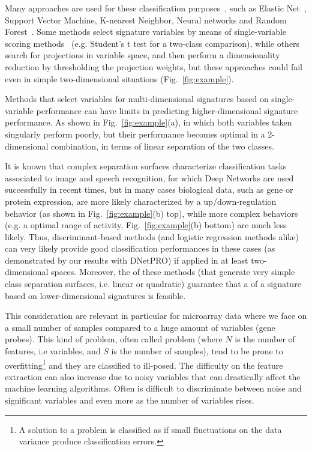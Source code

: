 \documentclass{standalone}
\begin{document}
Many approaches are used for these classification purposes~\cite{Guyon2002}, such as Elastic Net~\cite{Hughey2015}, Support Vector Machine, K-nearest Neighbor, Neural networks and Random Forest~\cite{Pang2012}.
Some methods select signature variables by means of single-variable scoring methods~\cite{Eckhard2012, Hocking1976} (e.g. Student's t test for a two-class comparison), while others search for projections in variable space, and then perform a dimensionality reduction by thresholding the projection weights, but these approaches could fail even in simple two-dimensional situations (Fig.~\ref{fig:example}).

Methods that select variables for multi-dimensional signatures based on single-variable performance can have limits in predicting higher-dimensional signature performance.
As shown in Fig.~\ref{fig:example}(a), in which both variables taken singularly perform poorly, but their performance becomes optimal in a 2-dimensional combination, in terms of linear separation of the two classes.

It is known that complex separation surfaces characterize classification tasks associated to image and speech recognition, for which Deep Networks are used successfully in recent times, but in many cases biological data, such as gene or protein expression, are more likely characterized by a up/down-regulation behavior (as shown in Fig.~\ref{fig:example}(b) top), while more complex behaviors (e.g. a  optimal range of activity, Fig.~\ref{fig:example}(b) bottom) are much less likely.
Thus, discriminant-based methods (and logistic regression methods alike) can very likely provide good classification performances in these cases (as demonstrated by our results with DNetPRO) if applied in at least two-dimensional spaces.
Moreover, the  of these methods (that generate very simple class separation surfaces, i.e. linear or quadratic) guarantee that a  of a signature based on lower-dimensional signatures is feasible.

This consideration are relevant in particular for microarray data where we face on a small number of samples compared to a huge amount of variables (gene probes).
This kind of problem, often called  problem (where $N$ is the number of features, i.e variables, and $S$ is the number of samples), tend to be prone to overfitting\footnote{
  A solution to a problem is classified as  if small fluctuations on the data variance produce classification errors.
} and they are classified to ill-posed.
The difficulty on the feature extraction can also increase due to noisy variables that can drastically affect the machine learning algorithms.
Often is difficult to discriminate between noise and significant variables and even more as the number of variables rises.
\end{document}
